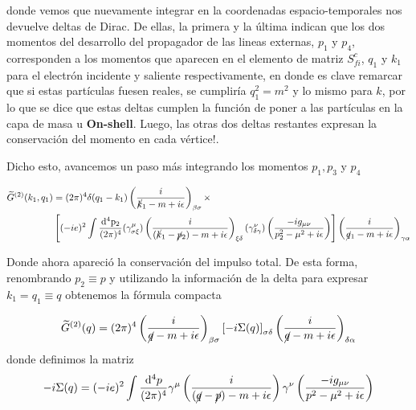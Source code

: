 \documentclass{article}
\numberwithin{equation}{section}
\begin{document}
donde vemos que nuevamente integrar en la coordenadas espacio-temporales nos devuelve deltas de Dirac. De ellas, la primera y la última indican que los dos momentos del desarrollo del propagador de las lineas externas, $p_{1}$ y $p_{4}$, corresponden a los momentos que aparecen en el elemento de matriz $S_{fi}^{c}$, $q_{1}$ y $k_{1}$ para el electrón incidente y saliente respectivamente, en donde es clave remarcar que si estas partículas fuesen reales, se cumpliría $q_{1}^{2}=m^{2}$ y lo mismo para $k$, por lo que se dice que estas deltas cumplen la función de poner a las partículas en la capa de masa u
\textbf{On-shell}. Luego, las otras dos deltas restantes expresan la conservación del momento en cada vértice!.

Dicho esto, avancemos un paso más integrando los momentos $ p_1,p_3 $ y $ p_4 $

\begin{equation}
\begin{aligned}
\widetilde{G}^{(2)}(k_{1},q_{1})&=(2\pi)^{4}\delta(q_{1}-k_{1})\left(\frac{i}{\cancel{k}_{1}-m+i\epsilon}\right)_{\beta\sigma}\times\\
&\left[(-ie)^{2}\int\frac{\mathrm{\mathrm{d^4}p_2}}{(2\pi)^{4}}(\gamma_{\sigma\xi}^{\mu})\left(\frac{i}{(\cancel{k}_{1}-\cancel{p}_2)-m+i\epsilon}\right)_{\xi\delta}(\gamma_{\delta\gamma}^{\nu})\left(\frac{-ig_{\mu\nu}}{p_2^{2}-\mu^{2}+i\epsilon}\right) \right] \left(\frac{i}{\cancel{q}_{1}-m+i\epsilon}\right)_{\gamma\alpha}
\end{aligned}
\end{equation}

Donde ahora apareció la conservación del impulso total. De esta forma,
renombrando $p_2\equiv p$ y utilizando la información de
la delta para expresar $k_{1}=q_{1}\equiv q$ obtenemos la fórmula compacta

\begin{equation}
\widetilde{G}^{(2)}(q)=(2\pi)^{4}\left(\frac{i}{\cancel{q}-m+i\epsilon}\right)_{\beta\sigma} \left[-i\Sigma(q)\right]_{\sigma \delta} \left(\frac{i}{\cancel{q}-m+i\epsilon}\right)_{\delta \alpha}
\end{equation}
donde definimos la matriz
\begin{equation}\label{autoenergiaelectron}
-i\Sigma(q)=(-ie)^{2}\int\frac{\mathrm{d^4}p}{(2\pi)^{4}}\gamma^{\mu}\left(\frac{i}{(\cancel{q}-\cancel{p})-m+i\epsilon}\right)\gamma^{\nu}\left(\frac{-ig_{\mu\nu}}{p^{2}-\mu^{2}+i\epsilon}\right)
\end{equation}
\end{document}
